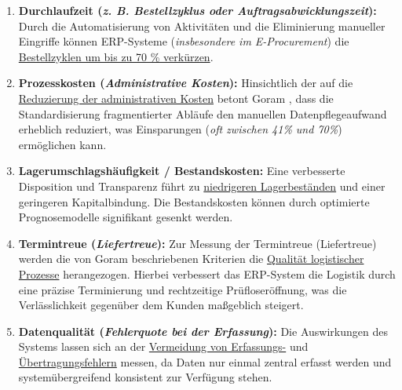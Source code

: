 \begin{enumerate}[label=\arabic*.), leftmargin=*]
    \item \textbf{Durchlaufzeit (\textit{\acs{z. B.} Bestellzyklus oder Auftragsabwicklungszeit}):} Durch die Automatisierung von Aktivitäten und die Eliminierung manueller Eingriffe können \acs{ERP}-Systeme (\textit{insbesondere im E-Procurement}) die \uline{Bestellzyklen um bis zu 70 \% verkürzen}.
    \item \textbf{Prozesskosten (\textit{Administrative Kosten}):} Hinsichtlich der auf die \uline{Reduzierung der administrativen Kosten} betont Goram \cite[19]{16}, dass die Standardisierung fragmentierter Abläufe den manuellen Datenpflegeaufwand erheblich reduziert, was Einsparungen (\textit{oft zwischen 41\% und 70\%}) ermöglichen kann.
    \item \textbf{Lagerumschlagshäufigkeit / Bestandskosten:} Eine verbesserte Disposition und Transparenz führt zu \uline{niedrigeren Lagerbeständen} und einer geringeren Kapitalbindung. Die Bestandskosten können durch optimierte Prognosemodelle signifikant gesenkt werden.
    \item \textbf{Termintreue (\textit{Liefertreue}):} Zur Messung der Termintreue (Liefertreue) werden die von Goram \cite[35]{32} beschriebenen Kriterien die \uline{Qualität logistischer Prozesse} herangezogen. Hierbei verbessert das \acs{ERP}-System die Logistik durch eine präzise Terminierung und rechtzeitige Prüfloseröffnung, was die Verlässlichkeit gegenüber dem Kunden maßgeblich steigert.
    \item \textbf{Datenqualität (\textit{Fehlerquote bei der Erfassung}):} Die Auswirkungen des Systems lassen sich an der \uline{Vermeidung von Erfassungs-} und \uline{Übertragungsfehlern} messen, da Daten nur einmal zentral erfasst werden und systemübergreifend konsistent zur Verfügung stehen.
\end{enumerate}

